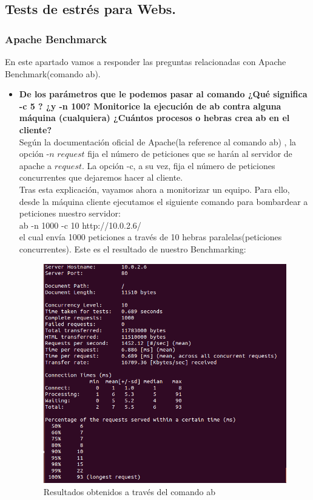 \subsection{Tests de estrés para Webs.}
\subsubsection{Apache Benchmarck}
En este apartado vamos a responder las preguntas relacionadas con Apache Benchmark(comando ab).\\
\begin{itemize}
	\item \textbf{De los parámetros que le podemos pasar al comando ¿Qué significa -c 5 ? ¿y -n 100? Monitorice la ejecución de ab contra alguna máquina (cualquiera) ¿Cuántos procesos o hebras crea ab en el cliente?}\\
	Según la documentación oficial de Apache(la reference al comando ab) \cite{ab}, la opción -$n$ $request$ fija el número de peticiones que se harán al servidor de apache a $request$. La opción -c, a su vez, fija el número de peticiones concurrentes que dejaremos hacer al cliente. \\
	Tras esta explicación, vayamos ahora a monitorizar un equipo. Para ello, desde la máquina cliente ejecutamos el siguiente comando para bombardear a peticiones nuestro servidor:\\
	
	ab -n 1000 -c 10 http://10.0.2.6/\\
	
	el cual envía 1000 peticiones a través de 10 hebras paralelas(peticiones concurrentes). Este es el resultado de nuestro Benchmarking:\\
	
	\begin{figure}[H]
		\centering
		\includegraphics[width=0.7\linewidth]{Ejecucion-ab}
		\caption[Ejecucion ab]{Resultados obtenidos a través del comando ab}
		\label{fig:Ejecucion-ab}
	\end{figure}
	

\end{itemize}
